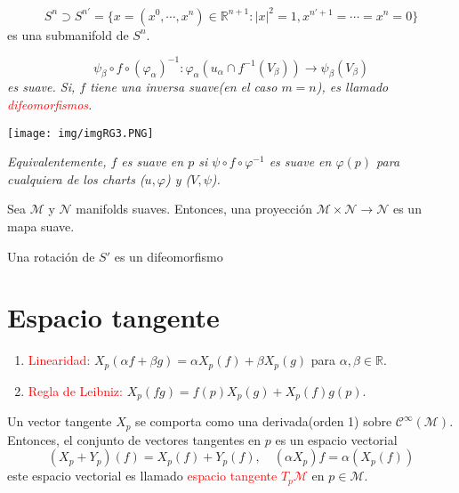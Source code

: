 \documentclass[../main]{subfiles}
\begin{document}
\ejemplo{} 
\begin{equation}
    S^n \supset S^{n'}=\{ x=(x^0, \cdots, x^n)\in \mathbb{R}^{n+1}:|x|^2=1, x^{n'+1}=\cdots=x^n=0\}
\end{equation}
es una submanifold de $S^n$.

\begin{equation}
    \psi_{\beta}\circ f \circ (\varphi_{\alpha})^{-1}: \varphi_{\alpha}(u_{\alpha} \cap f^{-1}(V_{\beta}))\rightarrow \psi_{\beta}(V_{\beta})
\end{equation}
\textit{es suave. Si, $f$ tiene una inversa suave(en el caso $m=n$), es llamado \textcolor{red}{difeomorfismos}.}

\begin{center}
    \texttt{[image: img/imgRG3.PNG]}
\end{center}

\textit{Equivalentemente, $f$ es suave en $p$ si $\psi \circ f\circ \varphi^{-1}$ es suave en $\varphi(p)$ para cualquiera de los charts ($u, \varphi$) y ($V, \psi$).}

\ejemplo{}
Sea $\mathcal{M}$ y $\mathcal{N}$ manifolds suaves. Entonces, una proyección $\mathcal{M} \times \mathcal{N} \rightarrow \mathcal{N}$ es un mapa suave.

\ejemplo{}
Una rotación de $S'$ es un difeomorfismo

\section{Espacio tangente}
\begin{enumerate}
    \item \textcolor{red}{Linearidad:} $X_p(\alpha f+\beta g)=\alpha X_p(f)+\beta X_p(g)$ para $\alpha, \beta \in \mathbb{R}$.
    \item \textcolor{red}{Regla de Leibniz:} $X_p(fg)=f(p)X_p(g)+X_p(f)g(p)$.
\end{enumerate}

Un vector tangente $X_p$ se comporta como una derivada(orden 1) sobre $\mathcal{C}^{\infty}(\mathcal{M})$. Entonces, el conjunto de vectores tangentes en $p$ es un espacio vectorial
\begin{equation}
    (X_p+Y_p)(f)=X_p(f)+Y_p(f),\quad (\alpha X_p)f=\alpha(X_p(f))
\end{equation}
este espacio vectorial es llamado \textcolor{red}{espacio tangente $T_p \mathcal{M}$} en $p\in \mathcal{M}$.
\end{document}
